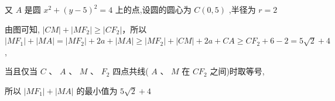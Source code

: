 \begin{enumerate}
\begin{jieda}
        又 ${A}$ 是圆 ${x}^{2} + {\left( y - 5\right) }^{2} = 4$ 上的点,设圆的圆心为 $C\left( {0,5}\right)$ ,半径为 $r = 2$
        
        由图可知, $\left| {CM}\right|  + \left| {M{F}_{2}}\right|  \geq  \left| {C{F}_{2}}\right|$，所以 $\left| {M{F}_{1}}\right|  + \left| {MA}\right|  = \left| {M{F}_{2}}\right|  + {2a} + \left| {MA}\right|  \geq  \left| {M{F}_{2}}\right|  + \left| {CM}\right|  + {2a} + {CA} \geq  C{F}_{2} + 6 - 2 = 5\sqrt{2} + 4$ ,
        
        当且仅当 $C$ 、 ${A}$ 、 $M$ 、 ${F}_{2}$ 四点共线( ${A}$ 、 $M$ 在 $C{F}_{2}$ 之间)时取等号,
        
        所以 $\left| {M{F}_{1}}\right|  + \left| {MA}\right|$ 的最小值为 $5\sqrt{2} + 4$
    \end{jieda}
    

\end{enumerate}
